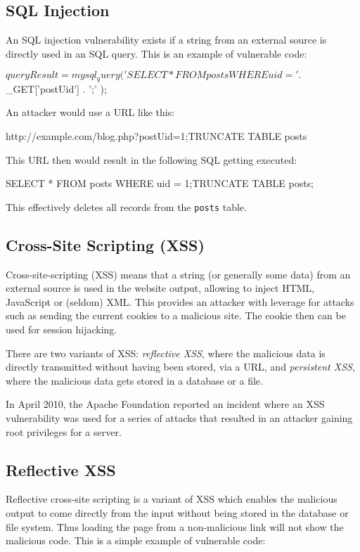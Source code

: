 \subsection{SQL Injection}
\label{sql-injection}
An SQL injection vulnerability exists if a string from an external source is directly used in an SQL query. This is an example of vulnerable code:

\begin{phpcode}
$queryResult = mysql_query(
  'SELECT * FROM posts WHERE uid = ' . $_GET['postUid'] . ';'
);
\end{phpcode}

An attacker would use a URL like this:

\begin{textcode}
http://example.com/blog.php?postUid=1;TRUNCATE TABLE posts
\end{textcode}

This URL then would result in the following SQL getting executed:

\begin{sqlcode}
SELECT * FROM posts WHERE uid = 1;TRUNCATE TABLE posts;
\end{sqlcode}

This effectively deletes all records from the \texttt{posts} table.


\subsection{Cross-Site Scripting (XSS)}
\label{xss}
Cross-site-scripting (XSS) means that a string (or generally some data) from an external source is used in the website output, allowing to inject HTML, JavaScript or (seldom) XML. This provides an attacker with leverage for attacks such as sending the current cookies to a malicious site. The cookie then can be used for session hijacking.

There are two variants of XSS: \emph{reflective XSS}, where the malicious data is directly transmitted without having been stored, \eg via a URL, and \emph{persistent XSS}, where the malicious data gets stored in a database or a file.

In April 2010, the Apache Foundation reported an incident where an XSS vulnerability was used for a series of attacks that resulted in an attacker gaining root privileges for a server. \cite{apache-incident-report}


\subsection{Reflective XSS}
Reflective cross-site scripting is a variant of XSS which enables the malicious output to come directly from the input without being stored in the database or file system. Thus loading the page from a non-malicious link will not show the malicious code. This is a simple example of vulnerable code:

